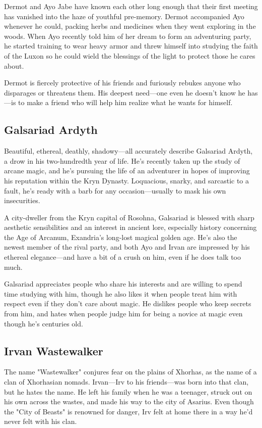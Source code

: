 \documentclass[10pt,a4paper,twoside,fancy,bg=print,twocolumn,openany,nodeprecatedcode]{dndbook}
\begin{document}
Dermot and Ayo Jabe have known each other long enough that their first meeting has vanished into the haze of youthful pre-memory. Dermot accompanied Ayo whenever he could, packing herbs and medicines when they went exploring in the woods. When Ayo recently told him of her dream to form an adventuring party, he started training to wear heavy armor and threw himself into studying the faith of the Luxon so he could wield the blessings of the light to protect those he cares about.

Dermot is fiercely protective of his friends and furiously rebukes anyone who disparages or threatens them. His deepest need—one even he doesn't know he has—is to make a friend who will help him realize what he wants for himself.

\subsection{Galsariad Ardyth}
Beautiful, ethereal, deathly, shadowy—all accurately describe Galsariad Ardyth, a drow in his two-hundredth year of life. He's recently taken up the study of arcane magic, and he's pursuing the life of an adventurer in hopes of improving his reputation within the Kryn Dynasty. Loquacious, snarky, and sarcastic to a fault, he's ready with a barb for any occasion—usually to mask his own insecurities.

A city-dweller from the Kryn capital of Rosohna, Galsariad is blessed with sharp aesthetic sensibilities and an interest in ancient lore, especially history concerning the Age of Arcanum, Exandria's long-lost magical golden age. He's also the newest member of the rival party, and both Ayo and Irvan are impressed by his ethereal elegance—and have a bit of a crush on him, even if he does talk too much.

Galsariad appreciates people who share his interests and are willing to spend time studying with him, though he also likes it when people treat him with respect even if they don't care about magic. He dislikes people who keep secrets from him, and hates when people judge him for being a novice at magic even though he's centuries old.

\subsection{Irvan Wastewalker}
The name "Wastewalker" conjures fear on the plains of Xhorhas, as the name of a clan of Xhorhasian nomads. Irvan—Irv to his friends—was born into that clan, but he hates the name. He left his family when he was a teenager, struck out on his own across the wastes, and made his way to the city of Asarius. Even though the "City of Beasts" is renowned for danger, Irv felt at home there in a way he'd never felt with his clan.
\end{document}
